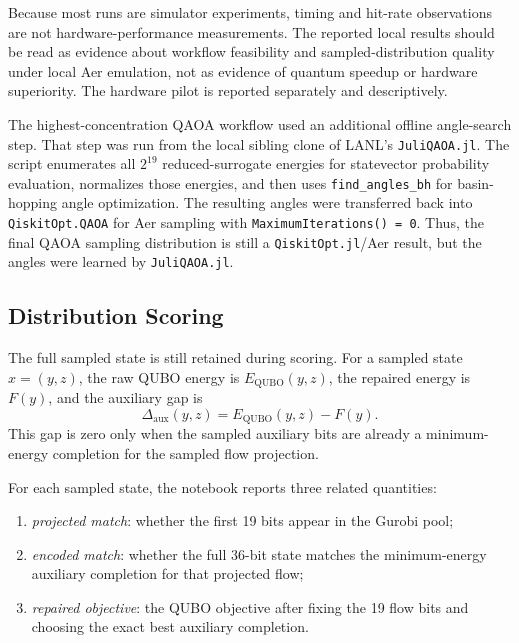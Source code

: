 Because most runs are simulator experiments, timing and hit-rate observations
are not hardware-performance measurements. The reported local results should be
read as evidence about workflow feasibility and sampled-distribution quality
under local Aer emulation, not as evidence of quantum speedup or hardware
superiority. The hardware pilot is reported separately and descriptively.

The highest-concentration QAOA workflow used an additional offline angle-search step. That
step was run from the local sibling clone of LANL's \texttt{JuliQAOA.jl}. The
script enumerates all $2^{19}$ reduced-surrogate energies for statevector
probability evaluation, normalizes those energies, and then uses
\texttt{find\_angles\_bh} for basin-hopping angle optimization. The resulting
angles were transferred back into \texttt{QiskitOpt.QAOA} for Aer sampling with
\texttt{MaximumIterations() = 0}. Thus, the final QAOA sampling distribution is
still a \texttt{QiskitOpt.jl}/Aer result, but the angles were learned by
\texttt{JuliQAOA.jl}.

\subsection{Distribution Scoring}
\label{subsec:ds-mfg-scoring}

The full sampled state is still retained during scoring. For a sampled state
$x=(y,z)$, the raw QUBO energy is $E_{\mathrm{QUBO}}(y,z)$, the repaired energy
is $F(y)$, and the auxiliary gap is
\[
    \Delta_{\mathrm{aux}}(y,z)
    =
    E_{\mathrm{QUBO}}(y,z) - F(y).
\]
This gap is zero only when the sampled auxiliary bits are already a
minimum-energy completion for the sampled flow projection.

For each sampled state, the notebook reports three related quantities:
\begin{enumerate}
    \item \emph{projected match}: whether the first 19 bits appear in the
    Gurobi pool;
    \item \emph{encoded match}: whether the full 36-bit state matches the
    minimum-energy auxiliary completion for that projected flow;
    \item \emph{repaired objective}: the QUBO objective after fixing the 19
    flow bits and choosing the exact best auxiliary completion.
\end{enumerate}

